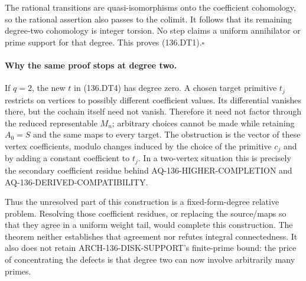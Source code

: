 The rational transitions are quasi-isomorphisms onto the coefficient
cohomology, so the rational assertion also passes to the colimit.
It follows that its remaining degree-two cohomology is integer
torsion.  No step claims a uniform annihilator or prime support
for that degree.  This proves (136.DT1).\hfill$\square$

\paragraph{Why the same proof stops at degree two.}
If $q=2$, the new $t$ in (136.DT4) has degree zero.  A chosen target
primitive $t_j$ restricts on vertices to possibly different
coefficient values.  Its differential vanishes there, but the
cochain itself need not vanish.  Therefore it need not factor
through the reduced representable $M_n$; arbitrary choices cannot
be made while retaining $A_0=S$ and the same maps to every target.
The obstruction is the vector of these vertex coefficients, modulo
changes induced by the choice of the primitive $c_j$ and by adding
a constant coefficient to $t_j$.  In a two-vertex situation this
is precisely the secondary coefficient residue behind
AQ-136-HIGHER-COMPLETION and AQ-136-DERIVED-COMPATIBILITY.

Thus the unresolved part of this construction is a fixed-form-degree
relative problem.  Resolving those coefficient residues, or replacing
the source/maps so that they agree in a uniform weight tail, would
complete this construction.  The theorem neither establishes that
agreement nor refutes integral connectedness.  It also does not
retain ARCH-136-DISK-SUPPORT's finite-prime bound: the price of
concentrating the defects is that degree two can now involve
arbitrarily many primes.
